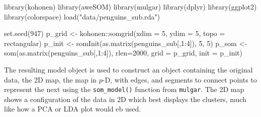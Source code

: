 \documentclass[
  letterpaper,
]{book}
\newenvironment{Shaded}{\begin{snugshade}}{\end{snugshade}}
\newcommand{\AttributeTok}[1]{\textcolor[rgb]{0.40,0.45,0.13}{#1}}
\newcommand{\DecValTok}[1]{\textcolor[rgb]{0.68,0.00,0.00}{#1}}
\newcommand{\FunctionTok}[1]{\textcolor[rgb]{0.28,0.35,0.67}{#1}}
\newcommand{\NormalTok}[1]{\textcolor[rgb]{0.00,0.23,0.31}{#1}}
\newcommand{\OtherTok}[1]{\textcolor[rgb]{0.00,0.23,0.31}{#1}}
\newcommand{\SpecialCharTok}[1]{\textcolor[rgb]{0.37,0.37,0.37}{#1}}
\newcommand{\StringTok}[1]{\textcolor[rgb]{0.13,0.47,0.30}{#1}}
\begin{document}
\begin{Shaded}
\begin{Highlighting}[]
\FunctionTok{library}\NormalTok{(kohonen)}
\FunctionTok{library}\NormalTok{(aweSOM)}
\FunctionTok{library}\NormalTok{(mulgar)}
\FunctionTok{library}\NormalTok{(dplyr)}
\FunctionTok{library}\NormalTok{(ggplot2)}
\FunctionTok{library}\NormalTok{(colorspace)}
\FunctionTok{load}\NormalTok{(}\StringTok{"data/penguins\_sub.rda"}\NormalTok{)}

\FunctionTok{set.seed}\NormalTok{(}\DecValTok{947}\NormalTok{)}
\NormalTok{p\_grid }\OtherTok{\textless{}{-}}\NormalTok{ kohonen}\SpecialCharTok{::}\FunctionTok{somgrid}\NormalTok{(}\AttributeTok{xdim =} \DecValTok{5}\NormalTok{, }\AttributeTok{ydim =} \DecValTok{5}\NormalTok{,}
                           \AttributeTok{topo =} \StringTok{\textquotesingle{}rectangular\textquotesingle{}}\NormalTok{)}
\NormalTok{p\_init }\OtherTok{\textless{}{-}} \FunctionTok{somInit}\NormalTok{(}\FunctionTok{as.matrix}\NormalTok{(penguins\_sub[,}\DecValTok{1}\SpecialCharTok{:}\DecValTok{4}\NormalTok{]), }\DecValTok{5}\NormalTok{, }\DecValTok{5}\NormalTok{)}
\NormalTok{p\_som }\OtherTok{\textless{}{-}} \FunctionTok{som}\NormalTok{(}\FunctionTok{as.matrix}\NormalTok{(penguins\_sub[,}\DecValTok{1}\SpecialCharTok{:}\DecValTok{4}\NormalTok{]), }
             \AttributeTok{rlen=}\DecValTok{2000}\NormalTok{,}
             \AttributeTok{grid =}\NormalTok{ p\_grid,}
             \AttributeTok{init =}\NormalTok{ p\_init)}
\end{Highlighting}
\end{Shaded}

The resulting model object is used to construct an object containing the
original data, the 2D map, the map in \(p\)-D, with edges, and segments
to connect points to represent the next using the \texttt{som\_model()}
function from \texttt{mulgar}. The 2D map shows a configuration of the
data in 2D which best displays the clusters, much like how a PCA or LDA
plot would eb used.
\end{document}
